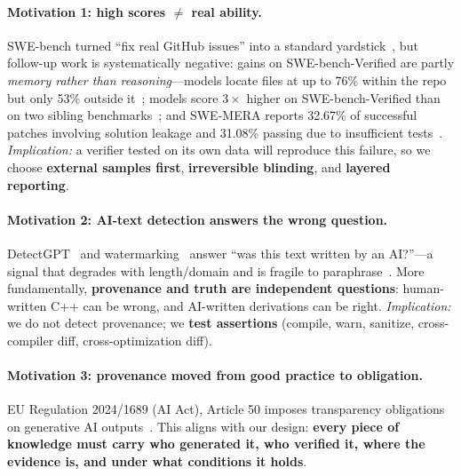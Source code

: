 \documentclass{article}
\begin{document}
\paragraph{Motivation 1: high scores $\neq$ real ability.}
SWE-bench turned ``fix real GitHub issues'' into a standard yardstick~\cite{jimenez2024swebench},
but follow-up work is systematically negative: gains on SWE-bench-Verified are partly
\emph{memory rather than reasoning}---models locate files at up to 76\% within the repo but only
53\% outside it~\cite{liang2025illusion}; models score $3\times$ higher on SWE-bench-Verified
than on two sibling benchmarks~\cite{prathifkumar2025verified}; and SWE-MERA reports 32.67\% of
successful patches involving solution leakage and 31.08\% passing due to insufficient
tests~\cite{adamenko2025swemera}. \emph{Implication:} a verifier tested on its own data will
reproduce this failure, so we choose \textbf{external samples first}, \textbf{irreversible
blinding}, and \textbf{layered reporting}.

\paragraph{Motivation 2: AI-text detection answers the wrong question.}
DetectGPT~\cite{mitchell2023detectgpt} and watermarking~\cite{kirchenbauer2023watermark} answer
``was this text written by an AI?''---a signal that degrades with length/domain and is fragile to
paraphrase~\cite{sadasivan2023canai}. More fundamentally, \textbf{provenance and truth are
independent questions}: human-written C++ can be wrong, and AI-written derivations can be right.
\emph{Implication:} we do not detect provenance; we \textbf{test assertions} (compile, warn,
sanitize, cross-compiler diff, cross-optimization diff).

\paragraph{Motivation 3: provenance moved from good practice to obligation.}
EU Regulation 2024/1689 (AI Act), Article 50 imposes transparency obligations on generative AI
outputs~\cite{eu2024aiact}. This aligns with our design: \textbf{every piece of knowledge must
carry who generated it, who verified it, where the evidence is, and under what conditions it
holds}.
\end{document}
